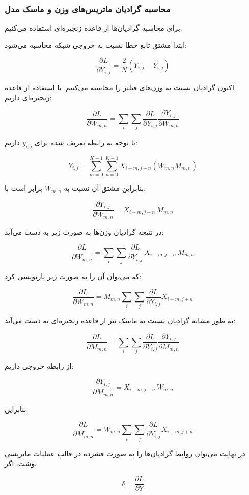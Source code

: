 \documentclass{article}
\begin{document}
\subsubsection{محاسبه گرادیان ماتریس‌های وزن و ماسک مدل}

برای محاسبه گرادیان‌ها از قاعده زنجیره‌ای استفاده می‌کنیم.

ابتدا مشتق تابع خطا نسبت به خروجی شبکه محاسبه می‌شود:

\[
\frac{\partial L}{\partial Y_{i,j}}
=
\frac{2}{N}(Y_{i,j}-\hat{Y}_{i,j})
\]

اکنون گرادیان نسبت به وزن‌های فیلتر را محاسبه می‌کنیم. با استفاده از قاعده زنجیره‌ای داریم:

\[
\frac{\partial L}{\partial W_{m,n}}
=
\sum_i \sum_j
\frac{\partial L}{\partial Y_{i,j}}
\frac{\partial Y_{i,j}}{\partial W_{m,n}}
\]

با توجه به رابطه تعریف شده برای $y_{i,j}$ داریم:

\[
Y_{i,j} =
\sum_{m=0}^{K-1}\sum_{n=0}^{K-1}
X_{i+m,j+n}(W_{m,n}M_{m,n})
\]

بنابراین مشتق آن نسبت به $W_{m,n}$ برابر است با:

\[
\frac{\partial Y_{i,j}}{\partial W_{m,n}}
=
X_{i+m,j+n}\,M_{m,n}
\]

در نتیجه گرادیان وزن‌ها به صورت زیر به دست می‌آید:

\[
\frac{\partial L}{\partial W_{m,n}}
=
\sum_i \sum_j
\frac{\partial L}{\partial Y_{i,j}}
\,
X_{i+m,j+n}
\,M_{m,n}
\]

که می‌توان آن را به صورت زیر بازنویسی کرد:

\[
\frac{\partial L}{\partial W_{m,n}}
=
M_{m,n}
\sum_i \sum_j
\frac{\partial L}{\partial Y_{i,j}}
X_{i+m,j+n}
\]

به طور مشابه گرادیان نسبت به ماسک نیز از قاعده زنجیره‌ای به دست می‌آید:

\[
\frac{\partial L}{\partial M_{m,n}}
=
\sum_i \sum_j
\frac{\partial L}{\partial Y_{i,j}}
\frac{\partial Y_{i,j}}{\partial M_{m,n}}
\]

از رابطه خروجی داریم:

\[
\frac{\partial Y_{i,j}}{\partial M_{m,n}}
=
X_{i+m,j+n}\,W_{m,n}
\]

بنابراین:

\[
\frac{\partial L}{\partial M_{m,n}}
=
W_{m,n}
\sum_i \sum_j
\frac{\partial L}{\partial Y_{i,j}}
X_{i+m,j+n}
\]

در نهایت می‌توان روابط گرادیان‌ها را به صورت فشرده در قالب عملیات ماتریسی نوشت. اگر

\[
\delta = \frac{\partial L}{\partial Y}
\]
\end{document}
